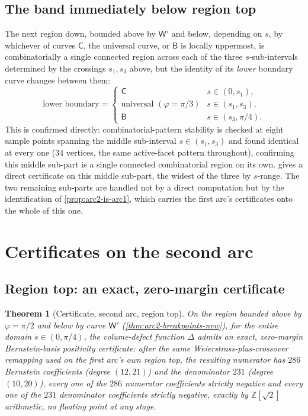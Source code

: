 \documentclass[11pt,reqno]{amsart}
\renewcommand{\_}{\origunderscore\allowbreak}
\numberwithin{equation}{section}
\theoremstyle{plain}
\newtheorem{thm}{Theorem}[section]
\theoremstyle{definition}
\theoremstyle{remark}
\newcommand{\tilt}{\varphi}                  %
\newcommand{\arcp}{s}                        %
\newcommand{\defect}{\Delta}                 %
\begin{document}
\subsection{The band immediately below region top}\label{sec:band-below-top-new}

The next region down, bounded above by $\mathsf W'$ and below,
depending on $\arcp$, by whichever of curves $\mathsf C$, the universal
curve, or $\mathsf B$ is locally uppermost, is combinatorially a
single connected region across each of the three $\arcp$-sub-intervals
determined by the crossings $\arcp_1,\arcp_3$ above, but the identity of
its \emph{lower} boundary curve changes between them:
\[
  \text{lower boundary} = \begin{cases}
    \mathsf C & \arcp\in(0,\arcp_1),\\
    \text{universal } (\tilt=\pi/3) & \arcp\in(\arcp_1,\arcp_3),\\
    \mathsf B & \arcp\in(\arcp_3,\pi/4).
  \end{cases}
\]
This is confirmed directly: combinatorial-pattern stability is checked
at eight sample points spanning the middle sub-interval
$\arcp\in(\arcp_1,\arcp_3)$ and found identical at every one ($34$
vertices, the same active-facet pattern throughout), confirming this
middle sub-part is a single connected combinatorial region on its own.
 gives a direct certificate on this middle
sub-part, the widest of the three by $\arcp$-range. The two remaining
sub-parts are handled not by a direct computation but by the
identification of \cref{prop:arc2-is-arc1}, which carries the first
arc's certificates onto the whole of this one.
\section{Certificates on the second arc}\label{sec:arc2-cert}

\subsection{Region top: an exact, zero-margin certificate}\label{sec:arc2-regiontop-new}

\begin{thm}[Certificate, second arc, region top]\label{thm:arc2-regiontop-new}
On the region bounded above by $\tilt=\pi/2$ and below by curve
$\mathsf W'$ (\cref{thm:arc2-breakpoints-new}), for the entire domain
$\arcp\in(0,\pi/4)$, the volume-defect function $\defect$ admits an
exact, zero-margin Bernstein-basis positivity certificate: after the
same Weierstrass-plus-crossover remapping used on the first arc's own
region top, the resulting numerator has $286$ Bernstein coefficients
(degree $(12,21)$) and the denominator $231$ (degree $(10,20)$), every
one of the $286$ numerator coefficients strictly negative and every
one of the $231$ denominator coefficients strictly negative, exactly
by $\mathbb{Z}[\sqrt2]$ arithmetic, no floating point at any stage.
\end{thm}
\end{document}
